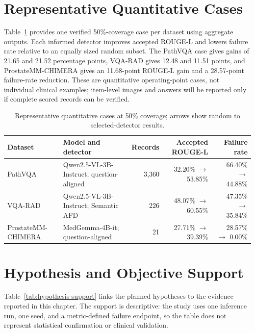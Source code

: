 \section{Representative Quantitative Cases}

Table~\ref{tab:representative-quantitative-cases} provides one verified 50\%-coverage case per dataset using aggregate outputs. Each informed detector improves accepted ROUGE-L and lowers failure rate relative to an equally sized random subset. The PathVQA case gives gains of 21.65 and 21.52 percentage points, VQA-RAD gives 12.48 and 11.51 points, and ProstateMM-CHIMERA gives an 11.68-point ROUGE-L gain and a 28.57-point failure-rate reduction. These are quantitative operating-point cases, not individual clinical examples; item-level images and answers will be reported only if complete scored records can be verified.

\begin{table}[htbp]
    \centering
    \caption{Representative quantitative cases at 50\% coverage; arrows show random to selected-detector results.}
    \label{tab:representative-quantitative-cases}
    \small
    \begin{tabularx}{\textwidth}{lXrrr}
        \toprule Dataset & Model and detector & Records & Accepted ROUGE-L & Failure rate \\ \midrule
        PathVQA & Qwen2.5-VL-3B-Instruct; question-aligned & 3,360 & 32.20\% $\rightarrow$ 53.85\% & 66.40\% $\rightarrow$ 44.88\% \\
        VQA-RAD & Qwen2.5-VL-3B-Instruct; Semantic AFD & 226 & 48.07\% $\rightarrow$ 60.55\% & 47.35\% $\rightarrow$ 35.84\% \\
        ProstateMM-CHIMERA & MedGemma-4B-it; question-aligned & 21 & 27.71\% $\rightarrow$ 39.39\% & 28.57\% $\rightarrow$ 0.00\% \\ \bottomrule
    \end{tabularx}
\end{table}

\section{Hypothesis and Objective Support}

Table~\ref{tab:hypothesis-support} links the planned hypotheses to the evidence reported in this chapter. The support is descriptive: the study uses one inference run, one seed, and a metric-defined failure endpoint, so the table does not represent statistical confirmation or clinical validation.

